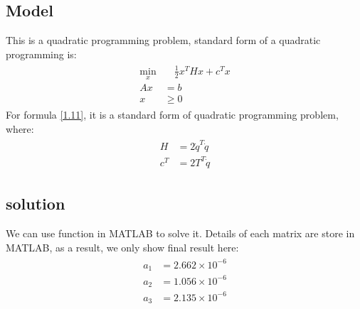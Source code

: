 \documentclass[titlepage,a4paper]{article}
\begin{document}
    \subsection{Model}
        This is a quadratic programming problem, standard form of a quadratic programming is:
        \begin{align}
        \begin{split}
            \min_x &\quad \frac 12x^THx + c^Tx\\
            Ax &= b\\
            x &\geq 0
        \end{split}
        \end{align} 
        For formula \eqref{1.11}, it is a standard form of quadratic programming problem, where:
        \begin{align}
        \begin{split}\label{1.11}
            H &= 2 \dot{q}^T \dot{q}\\
            c^T &= 2T^T\dot{q}
        \end{split}
        \end{align} 
        
    \subsection{solution}    
        We can use function in MATLAB to solve it. Details of each matrix are store in MATLAB, as a result, we only show final result here:
        \begin{align}
        \begin{split}
           a_1 &= 2.662\times10^{-6}\\
           a_2 &= 1.056\times10^{-6}\\
           a_3 &= 2.135\times10^{-6}      
        \end{split}
        \end{align}     
        
\end{document}
